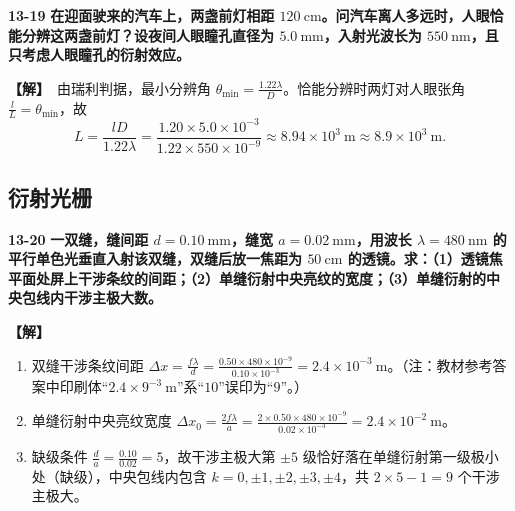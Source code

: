 \documentclass[zihao=5,a4paper,UTF8]{ctexart}
\newenvironment{prob}[2]{%
    \par\vspace{6pt}\noindent\textbf{\color{navy}#1} \textbf{#2}\par\nopagebreak\vspace{2pt}%
}{%
    \par\vspace{4pt}%
}
\newcommand{\sol}{\noindent\textbf{\color{tealaccent}【解】}\ }
\begin{document}
\begin{prob}{13-19}{在迎面驶来的汽车上，两盏前灯相距 $120\ \mathrm{cm}$。问汽车离人多远时，人眼恰能分辨这两盏前灯？设夜间人眼瞳孔直径为 $5.0\ \mathrm{mm}$，入射光波长为 $550\ \mathrm{nm}$，且只考虑人眼瞳孔的衍射效应。}
\sol 由瑞利判据，最小分辨角 $\theta_{\min} = \frac{1.22\lambda}{D}$。恰能分辨时两灯对人眼张角 $\frac{l}{L} = \theta_{\min}$，故
\[
    L = \frac{lD}{1.22\lambda} = \frac{1.20\times 5.0\times 10^{-3}}{1.22\times 550\times 10^{-9}} \approx 8.94\times 10^3\ \mathrm{m} \approx 8.9\times 10^3\ \mathrm{m}.
\]
\end{prob}

\subsection{衍射光栅}

\begin{prob}{13-20}{一双缝，缝间距 $d=0.10\ \mathrm{mm}$，缝宽 $a=0.02\ \mathrm{mm}$，用波长 $\lambda=480\ \mathrm{nm}$ 的平行单色光垂直入射该双缝，双缝后放一焦距为 $50\ \mathrm{cm}$ 的透镜。求：（1）透镜焦平面处屏上干涉条纹的间距；（2）单缝衍射中央亮纹的宽度；（3）单缝衍射的中央包线内干涉主极大数。}
\sol
\begin{enumerate}[leftmargin=2em, itemsep=2pt]
    \item 双缝干涉条纹间距 $\Delta x = \frac{f\lambda}{d} = \frac{0.50\times 480\times 10^{-9}}{0.10\times 10^{-3}} = 2.4\times 10^{-3}\ \mathrm{m}$。（注：教材参考答案中印刷体“$2.4\times 9^{-3}\ \mathrm{m}$”系“$10$”误印为“$9$”。）
    \item 单缝衍射中央亮纹宽度 $\Delta x_0 = \frac{2f\lambda}{a} = \frac{2\times 0.50\times 480\times 10^{-9}}{0.02\times 10^{-3}} = 2.4\times 10^{-2}\ \mathrm{m}$。
    \item 缺级条件 $\frac{d}{a} = \frac{0.10}{0.02} = 5$，故干涉主极大第 $\pm 5$ 级恰好落在单缝衍射第一级极小处（缺级），中央包线内包含 $k = 0, \pm 1, \pm 2, \pm 3, \pm 4$，共 $2\times 5 - 1 = 9$ 个干涉主极大。
\end{enumerate}
\end{prob}
\end{document}
